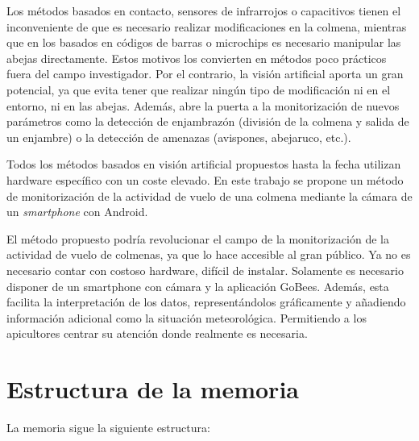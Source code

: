 Los métodos basados en contacto, sensores de infrarrojos o capacitivos
tienen el inconveniente de que es necesario realizar modificaciones en
la colmena, mientras que en los basados en códigos de barras o
microchips es necesario manipular las abejas directamente. Estos motivos
los convierten en métodos poco prácticos fuera del campo investigador.
Por el contrario, la visión artificial aporta un gran potencial, ya que
evita tener que realizar ningún tipo de modificación ni en el entorno,
ni en las abejas. Además, abre la puerta a la monitorización de nuevos
parámetros como la detección de enjambrazón (división de la colmena y
salida de un enjambre) o la detección de amenazas (avispones, abejaruco,
etc.).

Todos los métodos basados en visión artificial propuestos hasta la fecha
utilizan hardware específico con un coste elevado. En este trabajo se
propone un método de monitorización de la actividad de vuelo de una
colmena mediante la cámara de un \emph{smartphone} con Android.

El método propuesto podría revolucionar el campo de la monitorización de
la actividad de vuelo de colmenas, ya que lo hace accesible al gran
público. Ya no es necesario contar con costoso hardware, difícil de
instalar. Solamente es necesario disponer de un smartphone con cámara y
la aplicación GoBees. Además, esta facilita la interpretación de los
datos, representándolos gráficamente y añadiendo información adicional
como la situación meteorológica. Permitiendo a los apicultores centrar
su atención donde realmente es necesaria.

\section{Estructura de la memoria}\label{estructura-de-la-memoria}

La memoria sigue la siguiente estructura:

